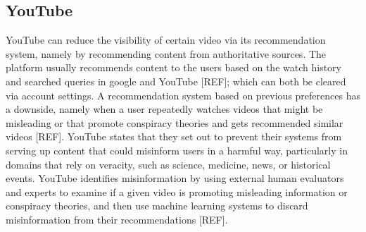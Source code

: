 \documentclass{article}
\begin{document}

\subsection{YouTube}

YouTube can reduce the visibility of certain video via its recommendation system, namely by recommending content from authoritative sources.
The platform usually recommends content to the users based on the watch history and searched queries in google and YouTube {\color{red} [REF]}; which can both be cleared via account settings.
A recommendation system based on previous preferences has a downside, namely when a user repeatedly watches videos that might be misleading or that promote conspiracy theories and gets recommended similar videos {\color{red} [REF]}.
YouTube states that they set out to prevent their systems from serving up content that could misinform users in a harmful way, particularly in domains that rely on veracity, such as science, medicine, news, or historical events.
YouTube identifies misinformation by using external human evaluators and experts to examine if a given video is promoting misleading information or conspiracy theories, and then use machine learning systems to discard misinformation from their recommendations {\color{red} [REF]}.

\smallskip
\end{document}
